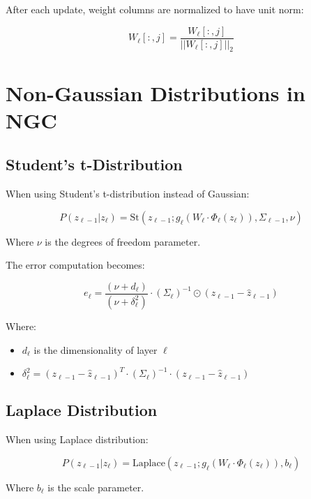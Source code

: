 \documentclass{article}
\begin{document}
After each update, weight columns are normalized to have unit norm:

\begin{equation}
  W_\ell[:,j] = \frac{W_\ell[:,j]}{||W_\ell[:,j]||_2}
\end{equation}

\section{Non-Gaussian Distributions in NGC}

\subsection{Student's t-Distribution}

When using Student's t-distribution instead of Gaussian:

\begin{equation}
  P(z_{\ell-1}|z_\ell) = \text{St}(z_{\ell-1}; g_\ell(W_\ell \cdot \Phi_\ell(z_\ell)), \Sigma_{\ell-1}, \nu)
\end{equation}

Where $\nu$ is the degrees of freedom parameter.

The error computation becomes:

\begin{equation}
  e_\ell = \frac{(\nu + d_\ell)}{(\nu + \delta_\ell^2)} \cdot (\Sigma_\ell)^{-1} \odot (z_{\ell-1} - \hat{z}_{\ell-1})
\end{equation}

Where:
\begin{itemize}
  \item $d_\ell$ is the dimensionality of layer $\ell$
  \item $\delta_\ell^2 = (z_{\ell-1} - \hat{z}_{\ell-1})^T \cdot (\Sigma_\ell)^{-1} \cdot (z_{\ell-1} - \hat{z}_{\ell-1})$
\end{itemize}

\subsection{Laplace Distribution}

When using Laplace distribution:

\begin{equation}
  P(z_{\ell-1}|z_\ell) = \text{Laplace}(z_{\ell-1}; g_\ell(W_\ell \cdot \Phi_\ell(z_\ell)), b_\ell)
\end{equation}

Where $b_\ell$ is the scale parameter.
\end{document}
